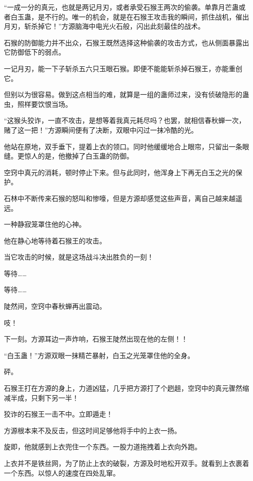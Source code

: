 
\begin{this_body}



“一成一分的真元，也就是两记月刃，或者承受石猴王两次的偷袭。单靠月芒蛊或者白玉蛊，是不行的。唯一的机会，就是在石猴王攻击我的瞬间，抓住战机，催出月刃，斩杀掉它！”方源脑海中电光火石般，闪出此刻最佳的战术。

石猴的防御能力并不出众，石猴王既然选择这种偷袭的攻击方式，也从侧面暴露出它防御低下的弱点。

一记月刃，能一下子斩杀五六只玉眼石猴。即便不能能斩杀掉石猴王，亦能重创它。

但别以为很容易。做到这点相当的难，就算是一组的蛊师过来，没有侦破隐形的蛊虫，照样要饮恨当场。

“这猴头狡诈，一直不攻击，是想等着我真元耗尽吗？也罢，就相信春秋蝉一次，赌了这一把！”方源瞬间便有了决断，双眼中闪过一抹冷酷的光。

他站在原地，双手垂下，提着上衣的领口。同时他缓缓地合上眼帘，只留出一条眼缝。更惊人的是，他撤掉了白玉蛊的防御。

空窍中真元的消耗，顿时停止下来。但与此同时，他浑身上下再无白玉之光的保护。

石林中不断传来石猴的怒叫和惨嚎，但是方源却感觉这些声音，离自己越来越遥远。

一种静寂笼罩住他的心神。

他在静心地等待着石猴王的攻击。

当它攻击的时候，就是这场战斗决出胜负的一刻！

等待……

等待……

陡然间，空窍中春秋蝉再出震动。

吱！

下一刻。方源耳边一声炸响，石猴王陡然出现在他的左侧！！

“白玉蛊！”方源双眼一抹精芒暴射，白玉之光笼罩住他的全身。

砰。

石猴王打在方源的身上，力道凶猛，几乎把方源打了个趔趄，空窍中的真元骤然缩减半成，只剩下另一半！

狡诈的石猴王一击不中。立即遁走！

方源根本来不及反击，但这时间足够他将手中的上衣一扬。

旋即，他就感到上衣兜住一个东西。一股力道拖拽着上衣向外跑。

上衣并不是铁丝网，为了防止上衣的破裂，方源及时地松开双手。就看到上衣裹着一个东西。以惊人的速度在四处乱窜。


\end{this_body}
